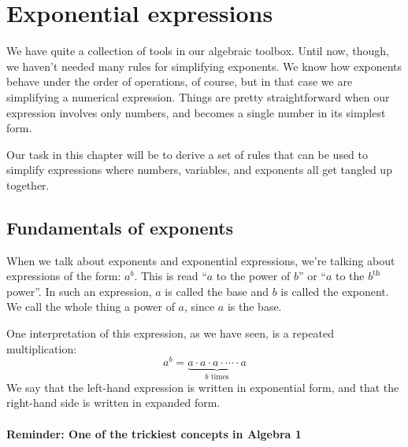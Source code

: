 \chapter{Exponential expressions}
\label{ch:expoexpr}


We have quite a collection of tools in our algebraic toolbox. Until now, though, we haven't needed many rules for simplifying exponents. We know how exponents behave under the order of operations, of course, but in that case we are simplifying a numerical expression. Things are pretty straightforward when our expression involves only numbers, and becomes a single number in its simplest form.

Our task in this chapter will be to derive a set of rules that can be used to simplify expressions where numbers, variables, and exponents all get tangled up together.

\section{Fundamentals of exponents}
\label{sec:expofundamentals}

When we talk about exponents and exponential expressions, we're talking about expressions of the form: $a^b$. This is read ``$a$ to the power of $b$'' or ``$a$ to the $b^{\text{th}}$ power''. In such an expression, $a$ is called the \gls{base} and $b$ is called the \gls{exponent}. We call the whole thing a \gls{power} of $a$, since $a$ is the base.

One interpretation of this expression, as we have seen, is a repeated multiplication:
\[a^b = \underbrace{a \cdot a \cdot a \cdot \dotsm \cdot a}_{\text{$b$ times}}\]
We say that the left-hand expression is written in \gls{exponential form}, and that the right-hand side is written in \gls{expanded form}.

\subsubsection{Reminder: One of the trickiest concepts in Algebra 1}

